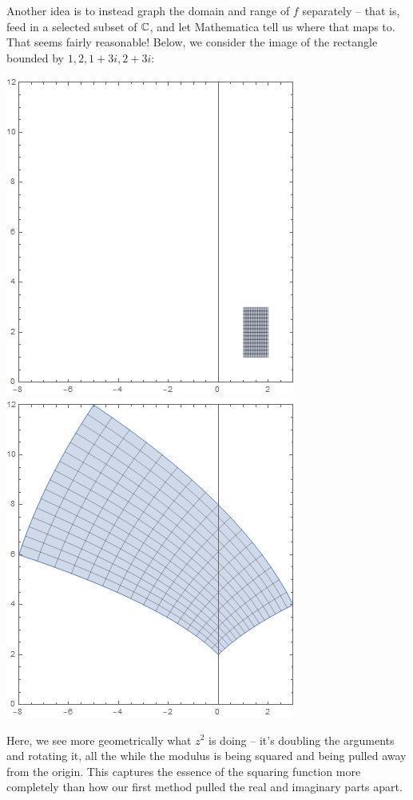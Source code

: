 Another idea is to instead graph the domain and range of $f$ separately -- that is, feed in a selected subset of $\mathbb C$, and let Mathematica tell us where that maps to. That seems fairly reasonable! Below, we consider the image of the rectangle bounded by $1, 2, 1+3i, 2+3i$:
\begin{center}
    \includegraphics[scale=0.5]{images/domzsqr.png}
    \includegraphics[scale=0.5]{images/ranzsqr.png}
\end{center}
Here, we see more geometrically what $z^2$ is doing -- it's doubling the arguments and rotating it, all the while the modulus is being squared and being pulled away from the origin. This captures the essence of the squaring function more completely than how our first method pulled the real and imaginary parts apart.

